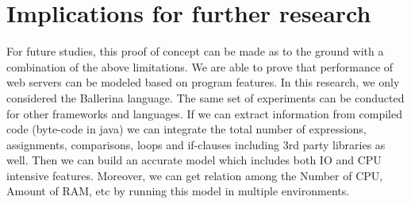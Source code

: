 \section{Implications for further research}

For future studies, this proof of concept can be made as to the ground with a combination of the above limitations. We are able to prove that performance of web servers can be modeled based on program features. In this research, we only considered the Ballerina language. The same set of experiments can be conducted for other frameworks and languages. If we can extract information from compiled code (byte-code in java) we can integrate the total number of expressions, assignments, comparisons, loops and if-clauses including 3rd party libraries as well. Then we can build an accurate model which includes both IO and CPU intensive features. Moreover, we can get relation among the Number of CPU, Amount of RAM, etc by running this model in multiple environments.     
